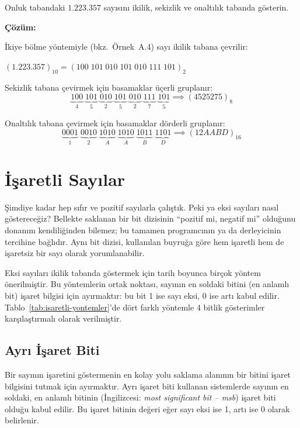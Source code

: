 \begin{ornek}[A.9]
Onluk tabandaki $1.223.357$ sayısını ikilik, sekizlik ve onaltılık tabanda gösterin.

\textbf{Çözüm:}

İkiye bölme yöntemiyle (bkz.\ Örnek~A.4) sayı ikilik tabana çevrilir:

$(1.223.357)_{10} = (100\;101\;010\;101\;010\;111\;101)_2$

Sekizlik tabana çevirmek için basamaklar üçerli gruplanır:
\[
\underbrace{100}_{4}\;\underbrace{101}_{5}\;\underbrace{010}_{2}\;\underbrace{101}_{5}\;\underbrace{010}_{2}\;\underbrace{111}_{7}\;\underbrace{101}_{5} \implies (4525275)_8
\]

Onaltılık tabana çevirmek için basamaklar dörderli gruplanır:
\[
\underbrace{0001}_{1}\;\underbrace{0010}_{2}\;\underbrace{1010}_{A}\;\underbrace{1010}_{A}\;\underbrace{1011}_{B}\;\underbrace{1101}_{D} \implies (12AABD)_{16}
\]
\end{ornek}


\section{İşaretli Sayılar}
\label{sec:isaretli-sayilar}

Şimdiye kadar hep sıfır ve pozitif sayılarla çalıştık. Peki ya eksi sayıları nasıl göstereceğiz? Bellekte saklanan bir bit dizisinin ``pozitif mi, negatif mi'' olduğunu donanım kendiliğinden bilemez; bu tamamen programcının ya da derleyicinin tercihine bağlıdır. Aynı bit dizisi, kullanılan buyruğa göre hem işaretli hem de işaretsiz bir sayı olarak yorumlanabilir.

Eksi sayıları ikilik tabanda göstermek için tarih boyunca birçok yöntem önerilmiştir. Bu yöntemlerin ortak noktası, sayının en soldaki bitini (en anlamlı bit) işaret bilgisi için ayırmaktır: bu bit 1 ise sayı eksi, 0 ise artı kabul edilir. Tablo~\ref{tab:isaretli-yontemler}'de dört farklı yöntemle 4 bitlik gösterimler karşılaştırmalı olarak verilmiştir.

\subsection{Ayrı İşaret Biti}

Bir sayının işaretini göstermenin en kolay yolu saklama alanının bir bitini işaret bilgisini tutmak için ayırmaktır. Ayrı işaret biti kullanan sistemlerde sayının en soldaki, en anlamlı bitinin (İngilizcesi: \textit{most significant bit -- msb}) işaret biti olduğu kabul edilir. Bu işaret bitinin değeri eğer sayı eksi ise 1, artı ise 0 olarak belirlenir.

